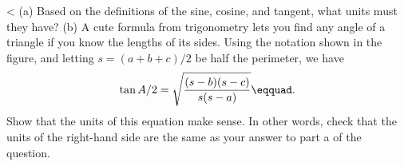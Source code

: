<%
(a) Based on the definitions of the sine, cosine, and tangent, what units
must they have?
(b) A cute formula from trigonometry lets you find any angle of
a triangle if you know the lengths of its sides. Using the
notation shown in the figure, and letting $s=(a+b+c)/2$ be half the
perimeter, we have 
\begin{equation*}
  \tan A/2=\sqrt{\frac{(s-b)(s-c)}{s(s-a)}}\eqquad.
\end{equation*}
Show that the units of this equation make sense. In other words, check that the
units of the right-hand side are the same as your answer to part a of the question.
